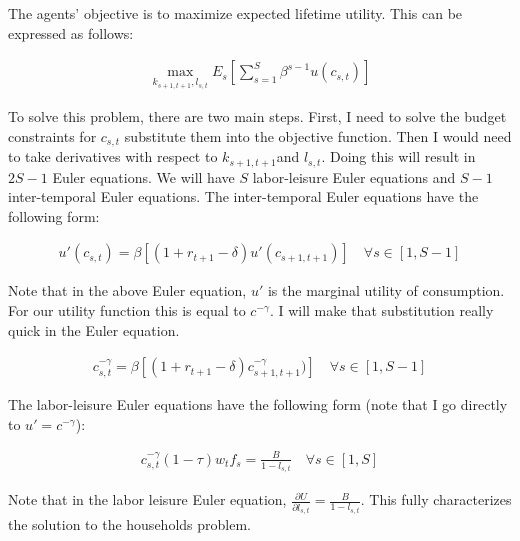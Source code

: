 \documentclass[paper=a4, fontsize=11pt]{scrartcl} %
\numberwithin{figure}{section} %
\numberwithin{table}{section} %
\begin{document}
          The agents' objective is to maximize expected lifetime utility. This can be expressed as follows:

          \begin{align}
              \max_{k_{s+1, t+1}, l_{s, t}} E_s \left[ \sum_{s=1}^S \beta ^{s-1}u(c_{s, t}) \right]
          \end{align}

          To solve this problem, there are two main steps. First, I need to solve the budget constraints for $c_{s, t}$ substitute them into the objective function. Then I would need to take derivatives with respect to $k_{s+1, t+1}$and $l_{s, t}$. Doing this will result in $2S - 1$ Euler equations. We will have $S$ labor-leisure Euler equations and $S-1$ inter-temporal Euler equations. The inter-temporal Euler equations have the following form:

          \begin{align}
              u'(c_{s, t}) = \beta \left[(1 + r_{t+1} - \delta)u'(c_{s+1, t+1})  \right] \quad\forall s \in [1, S-1]
          \end{align}

          Note that in the above Euler equation, $u'$ is the marginal utility of consumption. For our utility function this is equal to $c^{-\gamma}$. I will make that substitution really quick in the Euler equation.

          \begin{align}
              c_{s, t}^{-\gamma}= \beta \left[(1 + r_{t+1} - \delta) c_{s+1, t+1}^{-\gamma})  \right] \quad \forall s \in [1, S-1]
          \end{align}

          The labor-leisure Euler equations have the following form (note that I go directly to $u' = c^{-\gamma}$):

          \begin{align}
              c_{s, t}^{-\gamma} (1 - \tau) w_t f_s = \frac{B}{1 - l_{s,t}} \quad \forall s \in [1, S]
          \end{align}

          Note that in the labor leisure Euler equation, $\frac{\partial U }{\partial l_{s,t}} = \frac{B}{1 - l_{s,t}}$. This fully characterizes the solution to the households problem.


\end{document}
